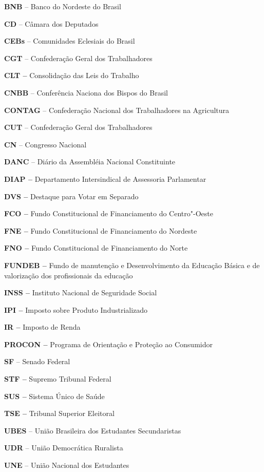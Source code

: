 \textbf{BNB} -- Banco do Nordeste do Brasil

\textbf{CD} -- Câmara dos Deputados

\textbf{CEBs} -- Comunidades Eclesiais do Brasil

\textbf{CGT} -- Confederação Geral dos Trabalhadores

\textbf{CLT --} Consolidação das Leis do Trabalho

\textbf{CNBB} -- Conferência Naciona dos Bispos do Brasil

\textbf{CONTAG} -- Confederação Nacional dos Trabalhadores na
Agricultura

\textbf{CUT} -- Confederação Geral dos Trabalhadores

\textbf{CN} -- Congresso Nacional

\textbf{DANC} -- Diário da Assembléia Nacional Constituinte

\textbf{DIAP --} Departamento Intersindical de Assessoria Parlamentar

\textbf{DVS --} Destaque para Votar em Separado

\textbf{FCO --} Fundo Constitucional de Financiamento do Centro"-Oeste

\textbf{FNE --} Fundo Constitucional de Financiamento do Nordeste

\textbf{FNO --} Fundo Constitucional de Financiamento do Norte

\textbf{FUNDEB --} Fundo de manutenção e Desenvolvimento da Educação
Básica e de valorização dos profissionais da educação

\textbf{INSS --} Instituto Nacional de Seguridade Social

\textbf{IPI --} Imposto sobre Produto Industrializado

\textbf{IR --} Imposto de Renda

\textbf{PROCON --} Programa de Orientação e Proteção ao Consumidor

\textbf{SF} -- Senado Federal

\textbf{STF --} Supremo Tribunal Federal

\textbf{SUS --} Sistema Único de Saúde

\textbf{TSE --} Tribunal Superior Eleitoral

\textbf{UBES} -- União Brasileira dos Estudantes Secundaristas

\textbf{UDR} -- União Democrática Ruralista

\textbf{UNE} -- União Nacional dos Estudantes

\textbf{\\
}

